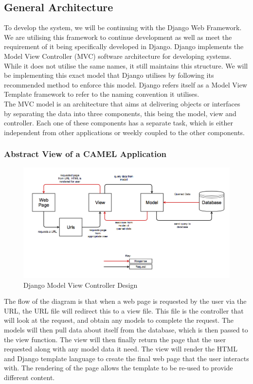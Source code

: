 \subsection{General Architecture}
	To develop the system, we will be continuing with the Django Web Framework. We are utilising this framework to continue development as well as meet the requirement of it being specifically developed in Django. Django implements the Model View Controller (MVC) software architecture for developing systems. While it does not utilise the same names, it still maintains this structure. We will be implementing this exact model that Django utilises by following its recommended method to enforce this model. Django refers itself as a Model View Template framework to refer to the naming convention it utilises.\\
		
		\noindent The MVC model is an architecture that aims at delivering objects or interfaces by separating the data into three components, this being the model, view and controller. Each one of these components has a separate task, which is either independent from other applications or weekly coupled to the other components.\\
		
		\subsubsection{Abstract View of  a CAMEL Application}	
		\begin{figure}[h]
			\includegraphics[scale=0.40]{softwarearchitecture/img/caml_mvc_abstract_diagram}
			\caption{Django Model View Controller Design}
			\centering
		\end{figure}
		
		The flow of the diagram is that when a web page is requested by the user via the URL, the URL file will redirect this to a view file. This file is the controller that will look at the request, and obtain any models to complete the request. The models will then pull data about itself from the database, which is then passed to the view function. The view will then finally return the page that the user requested along with any model data it need. The view will render the HTML and Django template language to create the final web page that the user interacts with. The rendering of the page allows the template to be re-used to provide different content.\\ 		
		
